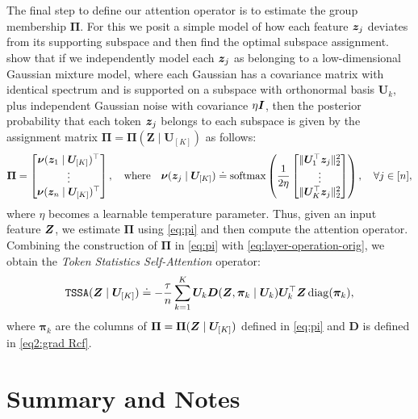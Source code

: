 \documentclass[\toplevelprefix/book-main.tex]{subfiles}
\begin{document}
The final step to define our attention operator is to estimate the group membership $\bm\Pi$. For this we posit a simple model of how each feature \(\bm{z}_{j}\) deviates from its supporting subspace and then find the optimal subspace assignment. \cite{yu2023white} show that if we independently model each \(\bm{z}_{j}\) as belonging to a low-dimensional Gaussian mixture model, where each Gaussian has a covariance matrix with identical spectrum and is supported on a subspace with orthonormal basis \(\bm U_{k}\), plus independent Gaussian noise with covariance \(\eta \bm{I}\), then the posterior probability that each token \(\bm{z}_{j}\) belongs to each subspace is given by the assignment matrix \(\bm \Pi = \bm \Pi(\bm Z \mid \bm U_{[K]})\) as follows:
\begin{align}\label{eq:pi}
    \bm \Pi = \begin{bmatrix} \boldsymbol{\nu}(\bm{z}_1 \mid \bm U_{[K]})^\top \\ \vdots \\ \boldsymbol{\nu}(\bm{z}_n \mid \bm U_{[K]})^\top \end{bmatrix}, \quad
\text{where} \quad 
\boldsymbol{\nu}(\bm{z}_j \mid \bm U_{[K]}) \doteq \operatorname{softmax}\left( \frac{1}{2\eta} \begin{bmatrix} \|  \bm U_{1}^{\top} \bm{z}_j \|_2^2 \\ \vdots \\ \| \bm U_{K}^{\top} \bm{z}_j \|_2^2 \end{bmatrix} \right), \quad \forall j \in [n],
\end{align}
where $\eta$ becomes a learnable temperature parameter. Thus, given an input feature \(\bm{Z}\), we estimate \(\bm\Pi\) using \eqref{eq:pi} and then compute the attention operator.  Combining the construction of $\bm\Pi$ in \eqref{eq:pi} with 
\eqref{eq:layer-operation-orig}, we obtain the {\em Token Statistics Self-Attention} operator: 
\begin{equation}
    \label{eq:tssa}
   \texttt{TSSA}(\bm{Z} \mid \bm U_{[K]}) \doteq -\frac{\tau}{n}\sum_{k = 1}^{K}\bm U_{k}\bm D(\bm{Z}, \bm\pi_{k} \mid \bm U_{k})\bm U_{k}^{\top}\bm{Z}\operatorname{diag}(\bm \pi_{k}),
\end{equation}
where \(\bm\pi_{k}\) are the columns of \(\bm\Pi = \bm\Pi(\bm{Z} \mid \bm U_{[K]})\) defined in \eqref{eq:pi} and \(\bm D\) is defined in \eqref{eq2:grad Rcf}. 




\section{Summary and Notes}
\end{document}
